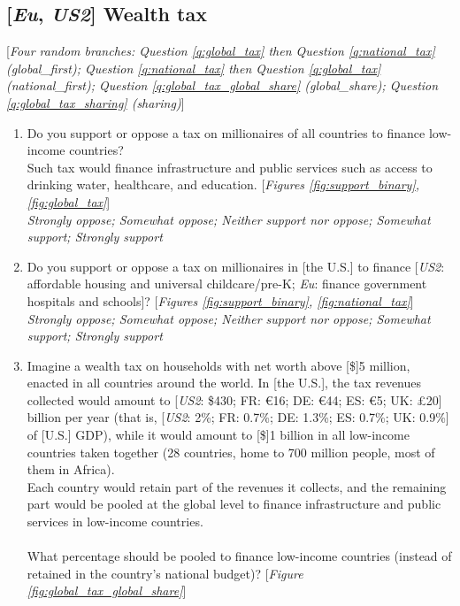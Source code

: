 \documentclass[12pt,english]{article}
\begin{document}
\subsection*{[\textit{Eu}, \textit{US2}] Wealth tax}
[\textit{Four random branches: Question \ref{q:global_tax} then Question \ref{q:national_tax} (global\_first); Question \ref{q:national_tax} then Question \ref{q:global_tax} (national\_first); Question \ref{q:global_tax_global_share} (global\_share); Question \ref{q:global_tax_sharing} (sharing)}]
\begin{enumerate}[resume] 
    \item \label{q:global_tax} Do you support or oppose a tax on millionaires of all countries to finance low-income countries? \\
    Such tax would finance infrastructure and public services such as access to drinking water, healthcare, and education. [\textit{Figures \ref{fig:support_binary}, \ref{fig:global_tax}}]
   \\ \textit{Strongly oppose; Somewhat oppose; Neither support nor oppose; Somewhat support; Strongly support}
   \item \label{q:national_tax} Do you support or oppose a tax on millionaires in [the U.S.] to finance [\textit{US2}: affordable housing and universal childcare/pre-K; \textit{Eu}: finance government hospitals and schools]?  [\textit{Figures \ref{fig:support_binary},  \ref{fig:national_tax}}]
  \\ \textit{Strongly oppose; Somewhat oppose; Neither support nor oppose; Somewhat support; Strongly support}
  \item \label{q:global_tax_global_share} Imagine a wealth tax on households with net worth above [\$]5 million, enacted in all countries around the world.  
  In [the U.S.], the tax revenues collected would amount to [\textit{US2}: \$430; FR: \euro{}16; DE: \euro{}44; ES: \euro{}5; UK: £20] billion per year (that is, [\textit{US2}: 2\%; FR: 0.7\%; DE: 1.3\%; ES: 0.7\%; UK: 0.9\%] of [U.S.] GDP), while it would amount to [\$]1 billion in all low-income countries taken together (28 countries, home to 700 million people, most of them in Africa).  \\
  Each country would retain part of the revenues it collects, and the remaining part would be pooled at the global level to finance infrastructure and public services in low-income countries.  \\
     \\
  What percentage should be pooled to finance low-income countries (instead of retained in the country's national budget)?  [\textit{Figure \ref{fig:global_tax_global_share}}]

\end{enumerate}
\end{document}
